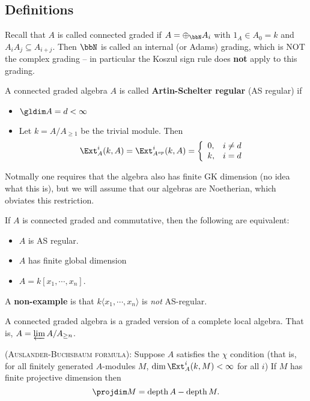 \documentclass[12pt]{article}
\DeclareMathOperator{\depth}{depth}
\begin{document}
\subsection{Definitions}
Recall that $A$ is called connected graded if $A=\oplus_\bbN A_i$ with $1_A\in A_0=k$ and $A_iA_j\subseteq A_{i+j}$. Then $\bbN$ is called 
an internal (or Adams) grading, which is NOT the complex grading -- in particular the Koszul sign rule does \textbf{not} apply to this grading.
\begin{defn}
	A connected graded algebra $A$ is called \textbf{Artin-Schelter regular} (AS regular) if 
	\begin{itemize}
		\item $\gldim A=d<\infty$
		\item Let $k=A/A_{\ge 1}$ be the trivial module. Then 
	\[\Ext_A^i(k,A)=\Ext_{A^{op}}^i(k,A)=\left\{\begin{array}{lr}0, & i\ne d\\ k,& i=d\end{array}\right.\]
	\end{itemize}
\end{defn}
\begin{rmk}
	Notmally one requires that the algebra also has finite GK dimension (no idea what this is), but we will assume that our algebras are Noetherian, 
	which obviates this restriction.
\end{rmk}
\begin{prop}
	If $A$ is connected graded and commutative, then the following are equivalent:
	\begin{itemize}
		\item $A$ is AS regular.
		\item $A$ has finite global dimension
		\item $A=k[x_1,\cdots,x_n]$.
	\end{itemize}
\end{prop}
\begin{ex}
	A \textbf{non-example} is that $k\langle x_1,\cdots,x_n\rangle$ is \textit{not} AS-regular.
\end{ex}
\begin{rmk}
	A connected graded algebra is a graded version of a complete local algebra. That is, $A=\varprojlim A/A_{\ge n}$.
\end{rmk}
\begin{rmk}\label{rmk-AB}
	\textsc{(Auslander-Buchsbaum formula)}: Suppose $A$ satisfies the $\chi$ condition (that is, for all finitely generated $A$-modules $M$, $\dim\Ext_A^i(k,M)<\infty$ for all $i$)
	If $M$ has finite projective dimension then 
	\[\projdim M=\depth A-\depth M.\]
\end{rmk}
\end{document}
